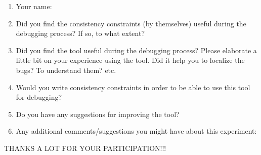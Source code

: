 \documentclass{article}
\title{}
\author{Debugging experiment - Exit survey for population Tool}
\date{July 30, 2003}
\begin{document}
\maketitle
\begin{flushleft}
\vspace{0.5in}

\thispagestyle{empty}

\begin{enumerate}
\item{Your name:}
\item{Did you find the consistency constraints (by themselves) useful during the debugging process?  If so, to what extent?\vspace{0.3in}}
\item{Did you find the tool useful during the debugging process?  Please elaborate a little bit on your experience using the tool.  Did it help you to localize the bugs?  To understand them?  etc.\vspace{1.2in}}
\item{Would you write consistency constraints in order to be able to use this tool for debugging?\vspace{0.3in}}
\item{Do you have any suggestions for improving the tool?\vspace{0.5in}}
\item{Any additional comments/suggestions you might have about this experiment:}
\end{enumerate}


\vspace{2.5in}
\begin{center}
THANKS A LOT FOR YOUR PARTICIPATION!!!
\end{center}

\end{flushleft}
\end{document}

